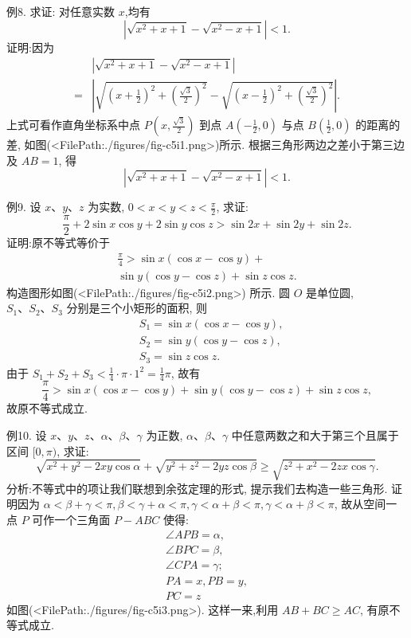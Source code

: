 例8. 求证: 对任意实数 $x$,均有
$$
\left|\sqrt{x^2+x+1}-\sqrt{x^2-x+1}\right|<1 .
$$
证明:因为
$$
\begin{aligned}
& \left|\sqrt{x^2+x+1}-\sqrt{x^2-x+1}\right| \\
= & \left|\sqrt{\left(x+\frac{1}{2}\right)^2+\left(\frac{\sqrt{3}}{2}\right)^2}-\sqrt{\left(x-\frac{1}{2}\right)^2+\left(\frac{\sqrt{3}}{2}\right)^2}\right| .
\end{aligned}
$$
上式可看作直角坐标系中点 $P\left(x, \frac{\sqrt{3}}{2}\right)$ 到点 $A\left(-\frac{1}{2}, 0\right)$ 与点 $B\left(\frac{1}{2}, 0\right)$ 的距离的差, 如图(<FilePath:./figures/fig-c5i1.png>)所示.
根据三角形两边之差小于第三边及 $A B=1$, 得
$$
\left|\sqrt{x^2+x+1}-\sqrt{x^2-x+1}\right|<1 .
$$



例9. 设 $x 、 y 、 z$ 为实数, $0<x<y<z<\frac{\pi}{2}$, 求证:
$$
\frac{\pi}{2}+2 \sin x \cos y+2 \sin y \cos z>\sin 2 x+\sin 2 y+\sin 2 z .
$$
证明:原不等式等价于
$$
\begin{gathered}
\frac{\pi}{4}>\sin x(\cos x-\cos y)+ \\
\sin y(\cos y-\cos z)+\sin z \cos z .
\end{gathered}
$$
构造图形如图(<FilePath:./figures/fig-c5i2.png>) 所示.
圆 $O$ 是单位圆, $S_1 、 S_2 、 S_3$ 分别是三个小矩形的面积, 则
$$
\begin{aligned}
& S_1=\sin x(\cos x-\cos y), \\
& S_2=\sin y(\cos y-\cos z), \\
& S_3=\sin z \cos z .
\end{aligned}
$$
由于 $S_1+S_2+S_3<\frac{1}{4} \cdot \pi \cdot 1^2=\frac{1}{4} \pi$, 故有
$$
\frac{\pi}{4}>\sin x(\cos x-\cos y)+\sin y(\cos y-\cos z)+\sin z \cos z,
$$
故原不等式成立.



例10. 设 $x 、 y 、 z 、 \alpha 、 \beta 、 \gamma$ 为正数, $\alpha 、 \beta 、 \gamma$ 中任意两数之和大于第三个且属于区间 $[0, \pi)$, 求证:
$$
\sqrt{x^2+y^2-2 x y \cos \alpha}+\sqrt{y^2+z^2-2 y z \cos \beta} \geqslant \sqrt{z^2+x^2-2 z x \cos \gamma} .
$$
分析:不等式中的项让我们联想到余弦定理的形式, 提示我们去构造一些三角形.
证明因为 $\alpha<\beta+\gamma<\pi, \beta<\gamma+\alpha<\pi, \gamma<\alpha+\beta<\pi, \gamma<\alpha+\beta<\pi$, 故从空间一点 $P$ 可作一个三角面 $P-A B C$ 使得:
$$
\begin{gathered}
\angle A P B=\alpha, \\
\angle B P C=\beta, \\
\angle C P A=\gamma ; \\
P A=x, P B=y, \\
P C=z 
\end{gathered}
$$
如图(<FilePath:./figures/fig-c5i3.png>).
这样一来,利用 $A B+B C \geqslant A C$, 有原不等式成立.



